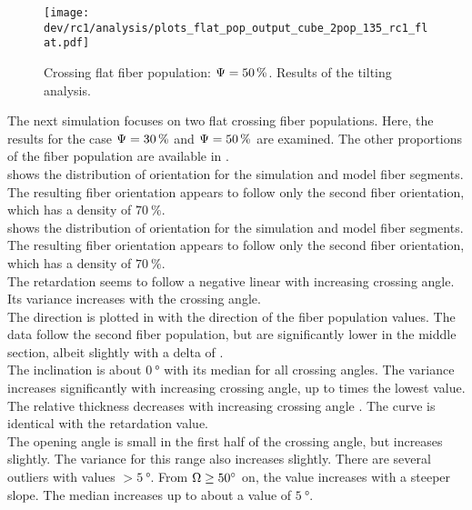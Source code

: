 % 
\begin{figure}[!p]
\centering
\texttt{[image: dev/rc1/analysis/plots\_flat\_pop\_output\_cube\_2pop\_135\_rc1\_flat.pdf]}
\caption[]{Crossing flat fiber population: $\textnormal{$\Psi$}=\SI{50}{\percent}$. Results of the tilting analysis.}
\label{fig:flat_05_fiber_pop_rofl}
\end{figure}
% 
The next simulation focuses on two flat crossing fiber populations.
Here, the results for the case $\textnormal{$\Psi$} = \SI{30}{\percent}$ and $\textnormal{$\Psi$} = \SI{50}{\percent}$ are examined.
The other proportions of the fiber population are available in \dummy[appendix]{}.
\\
% 
 shows the distribution of orientation for the simulation and model fiber segments.
The resulting fiber orientation appears to follow only the second fiber orientation, which has a density of $\SI{70}{\percent}$.
\\
 shows the distribution of orientation for the simulation and model fiber segments.
The resulting fiber orientation appears to follow only the second fiber orientation, which has a density of $\SI{70}{\percent}$.
\\
The retardation seems to follow a negative linear \dummy{} with increasing crossing angle.
Its variance increases with the crossing angle.
\\
The direction is plotted in \dummy{} with the direction of the fiber population values.
The data follow the second fiber population, but are significantly lower in the middle section, albeit slightly with a delta of \dummy[value]{}.
\\
The inclination is about $\SI{0}{\degree}$ with its median for all crossing angles.
The variance increases significantly with increasing crossing angle, up to \dummy[3]{} times the lowest value.
\\
The relative thickness \trel{} decreases with increasing crossing angle \modelOmega{}.
The curve is identical with the retardation value.
\\
The opening angle is small in the first half of the crossing angle, but increases slightly.
The variance for this range also increases slightly.
There are several outliers with values $> \SI{5}{\degree}$.
From $\textnormal{$\Omega$} \ge \SI{50}{\degree}$ on, the value increases with a steeper slope.
The median increases up to about a value of $\SI{5}{\degree}$.
% 
% 
